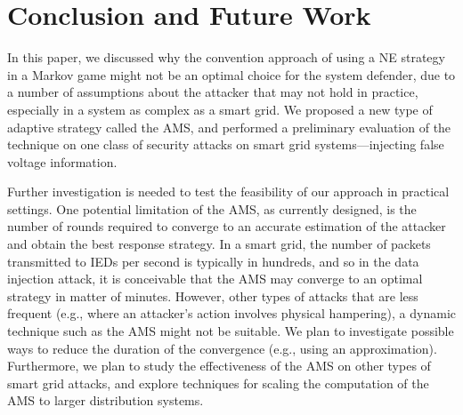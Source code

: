 \section{Conclusion and Future Work}
\label{conclusion}

In this paper, we discussed why the convention approach of using a NE strategy in a Markov game might not be an optimal choice for the system defender, due to a number of assumptions about the attacker that may not hold in practice, especially in a system as complex as a smart grid. We proposed a new type of adaptive strategy called the AMS, and performed a preliminary evaluation of the technique on one class of security attacks on smart grid systems---injecting false voltage information.

Further investigation is needed to test the feasibility of our approach in practical settings. One potential limitation of the AMS, as currently designed, is the number of rounds required to converge to an accurate estimation of the attacker and obtain the best response strategy. In a smart grid, the number of packets transmitted to IEDs per second is typically in hundreds, and so in the data injection attack, it is conceivable that the AMS may converge to an optimal strategy in matter of minutes. However, other types of attacks that are less frequent (e.g., where an attacker's action involves physical hampering), a dynamic technique such as the AMS might not be suitable. We plan to investigate possible ways to reduce the duration of the convergence (e.g., using an approximation). Furthermore, we plan to study the effectiveness of the AMS on other types of smart grid attacks, and explore techniques for scaling the computation of the AMS to larger distribution systems.
